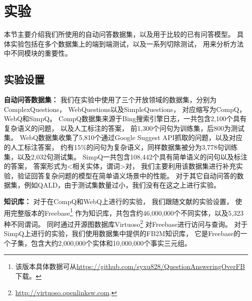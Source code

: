 
\section{实验}%

本节主要介绍我们所使用的自动问答数据集，以及用于比较的已有问答模型。
具体实验包括在多个数据集上的端到端测试，以及一系列切除测试，%
用来分析方法中不同模块的重要性。




\subsection{实验设置}%



\textbf{自动问答数据集：}
我们在实验中使用了三个开放领域的数据集，分别为ComplexQuestions\cite{bao2016constraint}，
WebQuestions\cite{berant2013semantic}以及SimpleQuestions\cite{bordes2015large}，
对应缩写为CompQ，WebQ和SimpQ。
CompQ数据集来源于Bing搜索引擎日志，一共包含2,100个具有复杂语义的问题，
以及人工标注的答案，
前1,300个问句为训练集，后800为测试集。
WebQ数据集收集了5,810个通过Google Suggest API抓取的问题，以及对应的人工标注答案，
约有15\%的问句为复杂语义，同样数据集被分为3,778句训练集，以及2,032句测试集。
SimpQ一共包含108,442个具有简单语义的问句以及标注的答案，
答案形式为\textless 相关实体，谓词\textgreater 对，
我们主要利用该数据集进行补充实验，验证回答复杂问题的模型在简单语义场景中的性能。
对于其它自动问答的数据集，例如QALD，由于测试集数量过小，我们没有在这之上进行实验。

\textbf{知识库：}
对于在CompQ和WebQ上进行的实验，
我们跟随文献\parencite{berant2013semantic,xu2016question}的实验设置，
使用完整版本的Freebase\footnote{
该版本具体数据可从\url{https://github.com/syxu828/QuestionAnsweringOverFB}下载。}
作为知识库，共包含约46,000,000个不同实体，以及5,323种不同谓词。
同时通过开源图数据库Virtuoso\footnote{\url{http://virtuoso.openlinksw.com}.}
对Freebase进行访问与查询。
对于SimpQ上进行的实验，我们使用数据集中提供的FB2M知识库，
它是Freebase的一个子集，包含大约2,000,000个实体和10,000,000个事实三元组。


